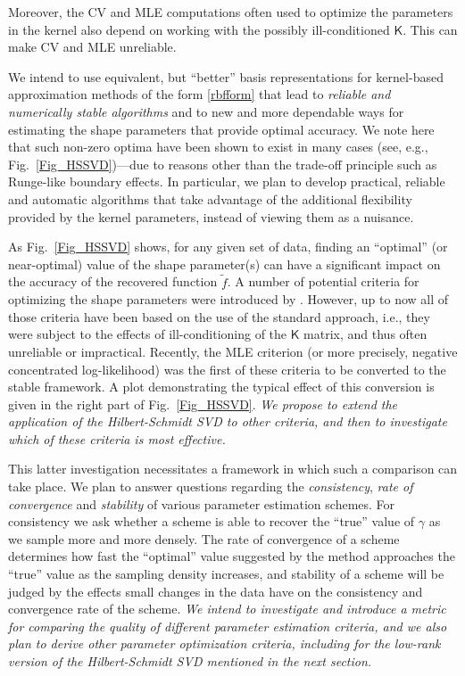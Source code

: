 \documentclass[11pt]{NSFamsart}
\newcommand{\tf}{\tilde{f}}
\newcommand{\mK}{\mathsf{K}}
\begin{document}
Moreover, the CV and MLE computations often used to optimize the parameters in the kernel also depend on working with the possibly ill-conditioned $\mK$.  This can make CV and MLE unreliable.

We intend to use equivalent, but ``better'' basis representations for kernel-based approximation methods of the form \eqref{rbfform} that lead to \emph{reliable and numerically stable algorithms} and to new and more dependable ways for estimating the shape parameters that provide optimal accuracy. We note here that such non-zero optima have been shown to exist in many cases (see, e.g., Fig.~\ref{Fig_HSSVD})---due to reasons other than the trade-off principle such as Runge-like boundary effects. In particular, we plan to develop practical, reliable and automatic algorithms that take advantage of the additional flexibility provided by the kernel parameters, instead of viewing them as a nuisance.

As Fig.~\ref{Fig_HSSVD} shows, for any given set of data, finding an ``optimal'' (or near-optimal) value of the shape parameter(s) can have a significant impact on the accuracy of the recovered function $\tf$. A number of potential criteria for optimizing the shape parameters were introduced by \cite{Fasshauer11}. However, up to now all of those criteria have been based on the use of the standard approach, i.e., they were subject to the effects of ill-conditioning of the $\mK$ matrix, and thus often unreliable or impractical. Recently, the MLE criterion (or more precisely, negative concentrated log-likelihood) was the first of these criteria to be converted to the stable framework. A plot demonstrating the typical effect of this conversion is given in the right part of Fig.~\ref{Fig_HSSVD}. \emph{We propose to extend the application of the Hilbert-Schmidt SVD to other criteria, and then to investigate which of these criteria is most effective.}

This latter investigation necessitates a framework in which such a comparison can take place. We plan to answer questions regarding the \emph{consistency}, \emph{rate of convergence} and \emph{stability} of various parameter estimation schemes. For consistency we ask whether a scheme is able to recover the ``true'' value of $\gamma$ as we sample more and more densely. The rate of convergence of a scheme determines how fast the ``optimal'' value suggested by the method approaches the ``true'' value as the sampling density increases, and stability of a scheme will be judged by the effects small changes in the data have on the consistency and convergence rate of the scheme. \emph{We intend to investigate and introduce a metric for comparing the quality of different parameter estimation criteria, and we also plan to derive other parameter optimization criteria, including for the low-rank version of the Hilbert-Schmidt SVD mentioned in the next section.}
\end{document}
